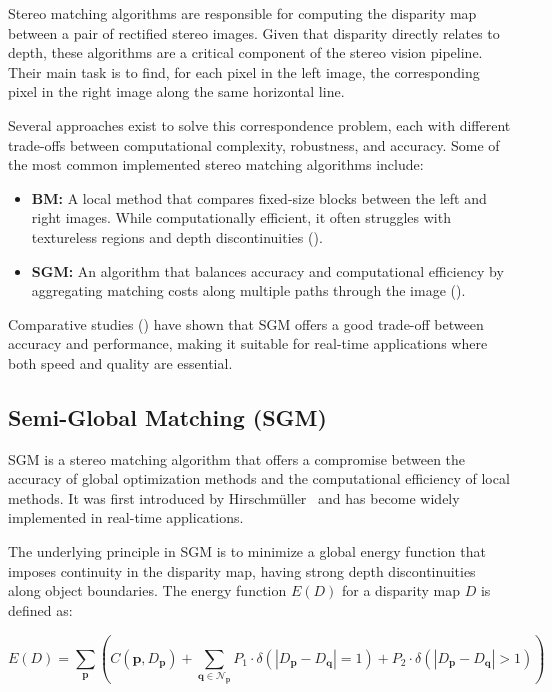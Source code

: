 Stereo matching algorithms are responsible for computing the disparity map between a pair of 
rectified stereo images. Given that disparity directly relates to depth, these algorithms are a 
critical component of the stereo vision pipeline. Their main task is to find, for each pixel in the 
left image, the corresponding pixel in the right image along the same horizontal line.

Several approaches exist to solve this correspondence problem, each with different trade-offs 
between computational complexity, robustness, and accuracy. Some of the most common implemented stereo
matching algorithms include:

\begin{itemize}
  \item \textbf{\gls{BM}:} A local method that compares fixed-size blocks between the left and right images. While computationally efficient, it often struggles with textureless regions and depth discontinuities (\cite{disparity_block_matching}). 
  \item \textbf{\gls{SGM}:} An algorithm that balances accuracy and computational efficiency by aggregating matching costs along multiple paths through the image (\cite{disparity_sgm}).
\end{itemize}

Comparative studies (\cite{disparity_survey}) have shown that SGM offers a good trade-off between accuracy and performance, making it suitable for real-time applications where both speed and quality are essential.


\subsection{Semi-Global Matching (SGM)}\label{sec:SGM}

\gls{SGM} is a stereo matching algorithm that offers a compromise between the 
accuracy of global optimization methods and the computational efficiency of local methods. It was first
introduced by Hirschmüller~\cite{disparity_sgm} and has become widely implemented in real-time 
applications.

The underlying principle in SGM is to minimize a global energy function that imposes continuity in the
disparity map, having strong depth discontinuities along object boundaries. The energy function $E(D)$
for a disparity map $D$ is defined as:

\begin{equation}
E(D) = \sum_{\mathbf{p}} \left( C(\mathbf{p}, D_{\mathbf{p}}) + \sum_{\mathbf{q} \in \mathcal{N}_{\mathbf{p}}} 
P_1 \cdot \delta\left( |D_{\mathbf{p}} - D_{\mathbf{q}}| = 1 \right) + P_2 \cdot \delta\left( |D_{\mathbf{p}} - D_{\mathbf{q}}| > 1 \right) \right)
\end{equation}

